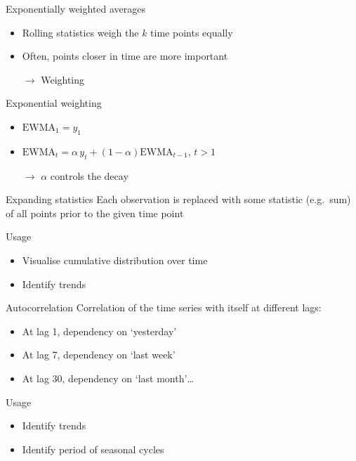 \begin{frame}{Exponentially weighted averages}
    \begin{itemize}
        \item Rolling statistics weigh the $k$ time points equally
        \item Often, points closer in time are more important
        \item[$\rightarrow$] Weighting
    \end{itemize}
    \vfill\pause
    \begin{block}{Exponential weighting}
        \begin{itemize}
            \item $\text{EWMA}_{1} = y_{1}$
            \item $\text{EWMA}_{t} = \alpha\,y_{t} + \left( 1 - \alpha \right) \text{EWMA}_{t-1}$, $t > 1$
            \item[$\rightarrow$] $\alpha$ controls the \alert{decay}
        \end{itemize}
    \end{block}
\end{frame}

\begin{frame}{Expanding statistics}
    Each observation is replaced with some statistic (e.g.\ sum) of all points
    prior to the given time point
    \vfill
    \begin{block}{Usage}
        \begin{itemize}
            \item Visualise cumulative distribution over time
            \item Identify trends
        \end{itemize}
    \end{block}
\end{frame}

\begin{frame}{Autocorrelation}
    Correlation of the time series with itself at different lags:\vspace{-1ex}
    \begin{itemize}
        \item At lag 1, dependency on `yesterday'
        \item At lag 7, dependency on `last week'
        \item At lag 30, dependency on `last month'\ldots
    \end{itemize}
    \vfill
    \begin{block}{Usage}
        \begin{itemize}
            \item Identify trends
            \item Identify period of seasonal cycles
        \end{itemize}
    \end{block}
\end{frame}


